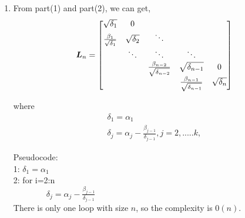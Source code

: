 \documentclass{article}
\begin{document}
\begin{enumerate}
\item
From part(1) and part(2), we can get, \\
\begin{displaymath}
\boldsymbol{L}_{n} = \begin{bmatrix} \sqrt{\delta_1} & 0 \\               
			\frac{\beta_1}{\sqrt{\delta_1}} & \sqrt{\delta_2} & \ddots \\
                       & \ddots & \ddots & \ddots \\
                       &          & \frac{\beta_{n-2}}{\sqrt{\delta_{n-2}}} & \sqrt{\delta_{n-1}} & 0\\
                       &          &              & \frac{\beta_{n-1}}{\sqrt{\delta_{n-1}}}  & \sqrt{\delta_{n}}  \end{bmatrix}
\end{displaymath}

where 
\begin{align*}
\delta_1=\alpha_1\\
\delta_j=\alpha_j-\frac{\beta_{j-1}}{\delta_{j-1}},  j =2, .....k, 
\end{align*}


Pseudocode: \\
1: $\delta_1=\alpha_1$\\
2: for i=2:n\\
  $\qquad \qquad \delta_j=\alpha_j-\frac{\beta_{j-1}}{\delta_{j-1}}$\\


There is only one loop with size $n$, so the complexity is $0(n)$. 



\end{enumerate} 



\hypertarget{}{}
\end{document}
